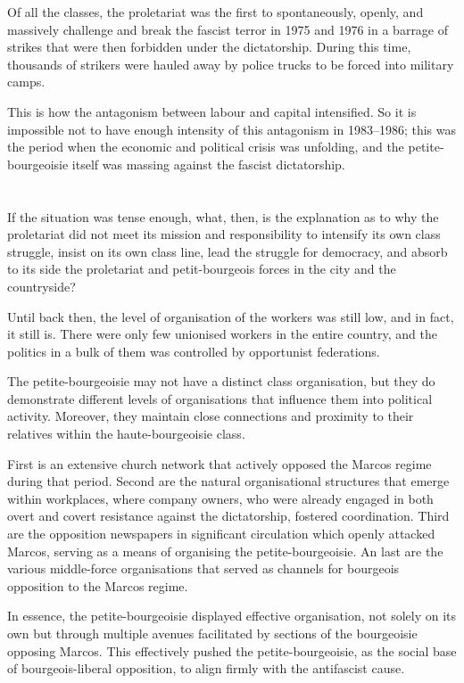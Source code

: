Of all the classes, 
the proletariat was the first to spontaneously, openly, and massively 
challenge and break 
the fascist terror in 1975 and 1976 
in a barrage of strikes that 
were then forbidden under the dictatorship. 
During this time, 
thousands of strikers were 
hauled away by police trucks 
to be forced into military camps.

This is how the antagonism between labour and capital intensified. 
So it is impossible not to have enough 
intensity of this antagonism in 1983--1986;
this was the period when the economic and political crisis was unfolding,
and the petite-bourgeoisie itself was massing against the fascist dictatorship.

\section{}
If the situation was tense enough, 
what, then, is the explanation as to 
why the proletariat did not meet its mission and responsibility 
to intensify its own class struggle, 
insist on its own class line, 
lead the struggle for democracy, 
and absorb to its side 
the proletariat and petit-bourgeois forces 
in the city and the countryside?

Until back then, 
the level of organisation of the workers was still low, 
and in fact, it still is. 
There were only few unionised workers in the entire country,
and the politics in a bulk of them was controlled by opportunist federations.

The petite-bourgeoisie may not have a distinct class organisation,
but they do demonstrate different levels of organisations 
that influence them into political activity.
Moreover, 
they maintain close connections and proximity 
to their relatives within the haute-bourgeoisie class.

First is an extensive church network
that actively opposed the Marcos regime during that period. 
Second are the natural organisational structures 
that emerge within workplaces, 
where company owners, who were already engaged 
in both overt and covert resistance 
against the dictatorship, fostered coordination. 
Third are the opposition newspapers 
in significant circulation which openly attacked Marcos, 
serving as a means of organising the petite-bourgeoisie. 
An last are the various middle-force organisations 
that served as channels 
for bourgeois opposition to the Marcos regime.

In essence, 
the petite-bourgeoisie displayed effective organisation, 
not solely on its own 
but through multiple avenues facilitated 
by sections of the bourgeoisie opposing Marcos. 
This effectively pushed the petite-bourgeoisie, 
as the social base of bourgeois-liberal opposition, 
to align firmly with the antifascist cause.


